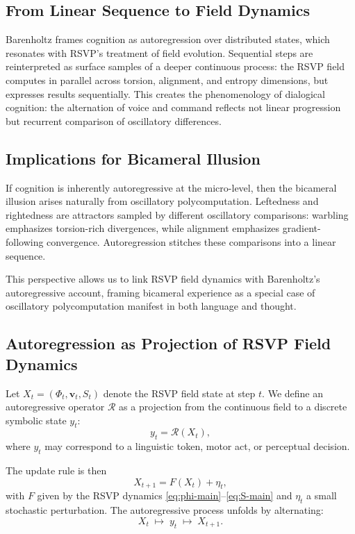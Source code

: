 \documentclass[a4paper,11pt]{article}
\begin{document}
\subsection{From Linear Sequence to Field Dynamics}
Barenholtz frames cognition as autoregression over distributed states, which resonates with RSVP’s treatment of field evolution. Sequential steps are reinterpreted as surface samples of a deeper continuous process: the RSVP field computes in parallel across torsion, alignment, and entropy dimensions, but expresses results sequentially. This creates the phenomenology of dialogical cognition: the alternation of voice and command reflects not linear progression but recurrent comparison of oscillatory differences.

\subsection{Implications for Bicameral Illusion}
If cognition is inherently autoregressive at the micro-level, then the bicameral illusion arises naturally from oscillatory polycomputation. Leftedness and rightedness are attractors sampled by different oscillatory comparisons: warbling emphasizes torsion-rich divergences, while alignment emphasizes gradient-following convergence. Autoregression stitches these comparisons into a linear sequence.

This perspective allows us to link RSVP field dynamics with Barenholtz’s autoregressive account, framing bicameral experience as a special case of oscillatory polycomputation manifest in both language and thought. 

\subsection{Autoregression as Projection of RSVP Field Dynamics}

Let $X_t = (\Phi_t, \mathbf{v}_t, S_t)$ denote the RSVP field state at step $t$.  
We define an autoregressive operator $\mathcal{R}$ as a projection from the continuous field to a discrete symbolic state $y_t$:
\begin{equation}
y_t = \mathcal{R}(X_t),
\end{equation}
where $y_t$ may correspond to a linguistic token, motor act, or perceptual decision.  

The update rule is then
\begin{equation}
X_{t+1} = F(X_t) + \eta_t,
\end{equation}
with $F$ given by the RSVP dynamics \eqref{eq:phi-main}--\eqref{eq:S-main} and $\eta_t$ a small stochastic perturbation.  
The autoregressive process unfolds by alternating:
\begin{equation}
X_t \;\mapsto\; y_t \;\mapsto\; X_{t+1}.
\end{equation}
\end{document}
